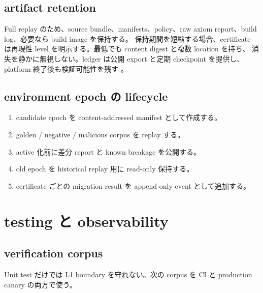 \documentclass[a4paper,11pt]{ltjsarticle}
\begin{document}
\subsection{artifact retention}

Full replay のため、source bundle、manifests、policy、raw axiom report、build log、必要なら build image を保持する。
保持期間を短縮する場合、certificate は再現性 level を明示する。最低でも content digest と複数 location を持ち、
消失を静かに無視しない。ledger は公開 export と定期 checkpoint を提供し、platform 終了後も検証可能性を残す
\cite{tfledger}。

\subsection{environment epoch の lifecycle}

\begin{enumerate}
  \item candidate epoch を content-addressed manifest として作成する。
  \item golden / negative / malicious corpus を replay する。
  \item active 化前に差分 report と known breakage を公開する。
  \item old epoch を historical replay 用に read-only 保持する。
  \item certificate ごとの migration result を append-only event として追加する。
\end{enumerate}

\section{testing と observability}

\subsection{verification corpus}

Unit test だけでは L1 boundary を守れない。次の corpus を CI と production canary の両方で使う。
\end{document}
